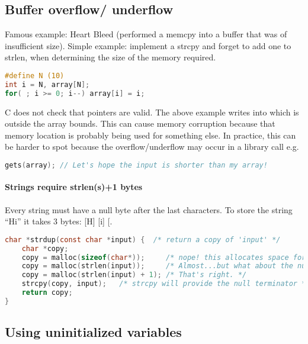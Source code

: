 \subsection{Buffer overflow/ underflow}\label{buffer-overflow-underflow}

Famous example: Heart Bleed (performed a memcpy into a buffer that was of insufficient size). Simple example: implement a strcpy and forget to add one to strlen, when determining the size of the memory required.

\begin{lstlisting}[language=C]
#define N (10)
int i = N, array[N];
for( ; i >= 0; i--) array[i] = i;
\end{lstlisting}

C does not check that pointers are valid. The above example writes into
 which is outside the array bounds. This can cause
memory corruption because that memory location is probably being used
for something else. In practice, this can be harder to spot because the
overflow/underflow may occur in a library call e.g.

\begin{lstlisting}[language=C]
gets(array); // Let's hope the input is shorter than my array!
\end{lstlisting}


\paragraph{Strings require strlen(s)+1 bytes}

Every string must have a null byte after the last characters. To store
the string ``Hi'' it takes 3 bytes: {[}H{]} {[}i{]} {[}\0{]}.

\begin{lstlisting}[language=C]
  char *strdup(const char *input) {  /* return a copy of 'input' */
    char *copy;
    copy = malloc(sizeof(char*));     /* nope! this allocates space for a pointer, not a string */
    copy = malloc(strlen(input));     /* Almost...but what about the null terminator? */
    copy = malloc(strlen(input) + 1); /* That's right. */
    strcpy(copy, input);   /* strcpy will provide the null terminator */
    return copy;
}
\end{lstlisting}

\subsection{Using uninitialized
	variables}\label{using-uninitialized-variables}

